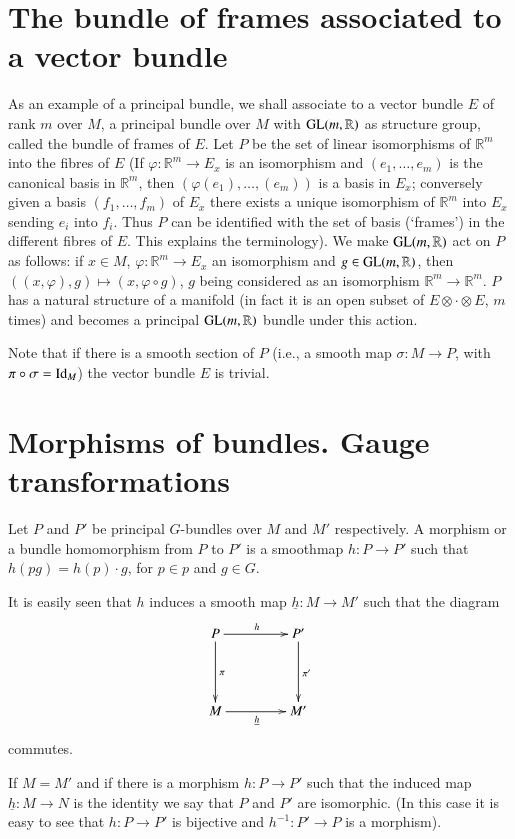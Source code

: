 \section*{The bundle of frames associated to a vector bundle}

As an example of a principal bundle, we shall associate to a vector bundle $E$ of rank $m$ over $M$, a principal bundle over $M$ with $\operatorname{GL}(m,\mathbb{R})$ as structure group, called the bundle of frames of $E$. Let $P$ be the set of linear isomorphisms of $\mathbb{R}^{m}$ into the fibres of $E$ (If $\varphi:\mathbb{R}^{m}\to E_{x}$ is an isomorphism and $(e_{1},\ldots,e_{m})$ is the canonical basis in $\mathbb{R}^{m}$, then $(\varphi(e_{1}),\ldots,(e_{m}))$ is a basis in $E_{x}$; conversely given a basis $(f_{1},\ldots,f_{m})$ of $E_{x}$ there exists a unique isomorphism of $\mathbb{R}^{m}$ into $E_{x}$ sending $e_{i}$ into $f_{i}$. Thus $P$ can be identified with the set of basis (`frames') in the different fibres of $E$. This explains the terminology). We make $\operatorname{GL}(m,\mathbb{R})$ act on $P$ as follows: if $x\in M$, $\varphi:\mathbb{R}^{m}\to E_{x}$ an isomorphism and $g\in \operatorname{GL}(m,\mathbb{R})$, then $((x,\varphi),g)\mapsto (x,\varphi\circ g)$, $g$ being considered as an isomorphism $\mathbb{R}^{m}\to \mathbb{R}^{m}$. $P$ has a natural structure of a manifold (in fact it is an open subset of $E\otimes\cdot\otimes E$, $m$ times) and becomes a principal $\operatorname{GL}(m,\mathbb{R})$ bundle under this action.

Note that if there is a smooth section of $P$ (i.e., a smooth map $\sigma:M\to P$, with $\pi\circ \sigma=\operatorname{Id}_{M}$) the vector bundle $E$ is trivial.

\section*{Morphisms of bundles. Gauge transformations}

Let $P$ and $P'$ be principal $G$-bundles over $M$ and $M'$ respectively. A morphism or a bundle homomorphism from $P$ to $P'$ is a smooth\pageoriginale map $h:P\to P'$ such that $h(pg)=h(p)\cdot g$, for $p\in p$ and $g\in G$.

It is easily seen that $h$ induces a smooth map $\underline{h}:M\to M'$ such that the diagram
\[
\xymatrix@=1.5cm{
P\ar[d]^{\pi}\ar[r]^{h} & P'\ar[d]^{\pi'}\\
M\ar[r]_{\underline{h}} & M'
}
\]
commutes.

If $M=M'$ and if there is a morphism $h:P\to P'$ such that the induced map $\underline{h}:M\to N$ is the identity we say that $P$ and $P'$ are isomorphic. (In this case it is easy to see that $h:P\to P'$ is bijective and $h^{-1}:P'\to P$ is a morphism).

